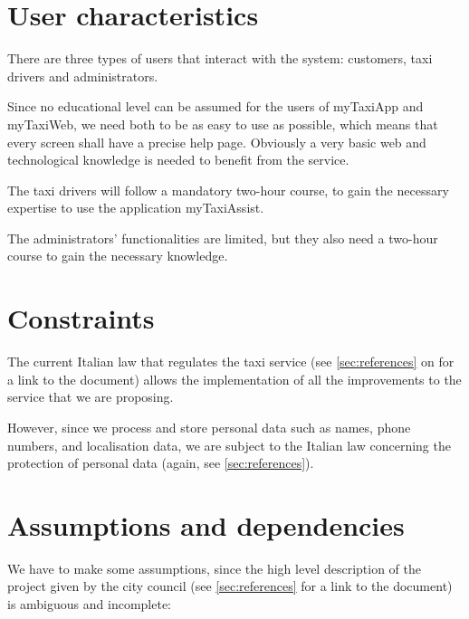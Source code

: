 \section{User characteristics}
There are three types of users that interact with the system: customers, taxi drivers and administrators. 

Since no educational level can be assumed for the users of myTaxiApp and myTaxiWeb, we need both to be as easy to use as possible, which means that every screen shall have a precise help page. Obviously a very basic web and technological knowledge is needed to benefit from the service.

The taxi drivers will follow a mandatory two-hour course, to gain the necessary expertise to use the application myTaxiAssist. 

The administrators' functionalities are limited, but they also need a two-hour course to gain the necessary knowledge.


\section{Constraints}  
The current Italian law that regulates the taxi service (see \cref{sec:references} on  for a link to the document) allows the implementation of all the improvements to the service that we are proposing. 

However, since we process and store personal data such as names, phone numbers, and localisation data, we are subject to the Italian law concerning the protection of personal data (again, see \cref{sec:references}).


\section{Assumptions and dependencies}
We have to make some assumptions, since the high level description of the project given by the city council (see \cref{sec:references} for a link to the document) is ambiguous and incomplete:

